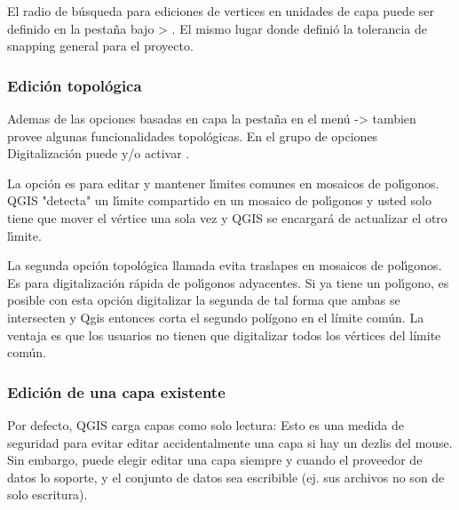 El radio de b\'usqueda para ediciones de vertices en unidades de capa puede ser definido en la
pesta\~na  bajo  >
. El mismo lugar donde defini\'o la
tolerancia de snapping general para el proyecto.

\subsubsection{Edici\'on topol\'ogica}

Ademas de las opciones basadas en capa la pesta\~na  en el men\'u 
 ->  
tambien provee algunas funcionalidades topol\'ogicas. 
En el grupo de opciones Digitalizaci\'on puede  y/o activar 
.


La opci\'on  es para editar y mantener 
l\'{\i}mites comunes en mosaicos de pol\'{\i}gonos. QGIS "detecta" un l\'{\i}mite compartido en 
un mosaico de pol\'{\i}gonos y usted solo tiene que mover el v\'ertice una sola vez y QGIS se encargar\'a 
de actualizar el otro l\'{\i}mite.


La segunda opci\'on topol\'ogica llamada  
evita traslapes en mosaicos de pol\'{\i}gonos. Es para digitalizaci\'on r\'apida de pol\'{\i}gonos adyacentes. 
Si ya tiene un pol\'{\i}gono, es posible con esta opci\'on digitalizar la segunda 
de tal forma que ambas se intersecten y Qgis entonces corta el segundo pol\'{i}gono en el l\'{i}mite com\'un. 
La ventaja es que los usuarios no tienen que digitalizar todos los v\'ertices del l\'{i}mite com\'un.

\subsubsection{Edici\'on de una capa existente}
\label{sec:edit_existing_layer}

Por defecto, QGIS carga capas como solo lectura: Esto es una medida de seguridad
para evitar editar accidentalmente una capa si hay un dezlis del mouse.
Sin embargo, puede elegir editar una capa siempre y cuando el proveedor de datos lo soporte,
y el conjunto de datos sea escribible (ej. sus archivos no son de solo escritura).

